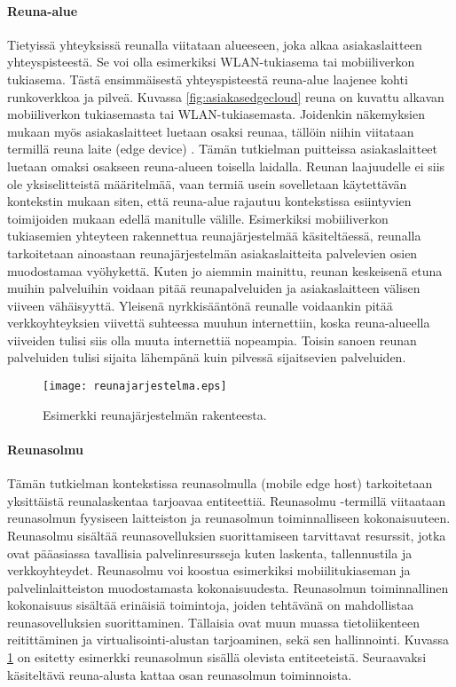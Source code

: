 \paragraph{Reuna-alue} 
Tietyissä yhteyksissä reunalla viitataan alueeseen, joka alkaa asiakaslaitteen yhteyspisteestä. Se voi olla esimerkiksi WLAN-tukiasema tai mobiiliverkon tukiasema. Tästä ensimmäisestä yhteyspisteestä reuna-alue laajenee kohti runkoverkkoa ja pilveä.
Kuvassa \ref{fig:asiakasedgecloud} reuna on kuvattu alkavan mobiiliverkon tukiasemasta tai WLAN-tukiasemasta.
Joidenkin näkemyksien mukaan myös asiakaslaitteet luetaan osaksi reunaa, tällöin niihin viitataan termillä reuna laite (edge device) \cite{garcia}.
Tämän tutkielman puitteissa asiakaslaitteet luetaan omaksi osakseen reuna-alueen toisella laidalla.
Reunan laajuudelle ei siis ole yksiselitteistä määritelmää, vaan termiä usein sovelletaan käytettävän kontekstin mukaan siten, että reuna-alue rajautuu kontekstissa esiintyvien toimijoiden mukaan edellä manitulle välille.
Esimerkiksi mobiiliverkon tukiasemien yhteyteen rakennettua reunajärjestelmää käsiteltäessä, reunalla tarkoitetaan ainoastaan reunajärjestelmän asiakaslaitteita palvelevien osien muodostamaa vyöhykettä. 
Kuten jo aiemmin mainittu, reunan keskeisenä etuna muihin palveluihin voidaan pitää reunapalveluiden ja asiakaslaitteen välisen viiveen vähäisyyttä.
Yleisenä nyrkkisääntönä reunalle voidaankin pitää verkkoyhteyksien viivettä suhteessa muuhun internettiin, koska reuna-alueella viiveiden tulisi siis olla muuta internettiä nopeampia. Toisin sanoen reunan palveluiden tulisi sijaita lähempänä kuin pilvessä sijaitsevien palveluiden.

\begin{figure}[tb]
\texttt{[image: reunajarjestelma.eps]}
\caption{Esimerkki reunajärjestelmän rakenteesta.} \label{fig:reunajarjestelma}
\end{figure}


\paragraph{Reunasolmu} 
Tämän tutkielman kontekstissa reunasolmulla (mobile edge host) tarkoitetaan yksittäistä reunalaskentaa tarjoavaa entiteettiä\cite{etsirefarch}.
Reunasolmu -termillä viitaataan reunasolmun fyysiseen laitteiston ja reunasolmun toiminnalliseen kokonaisuuteen.
Reunasolmu sisältää reunasovelluksien suorittamiseen tarvittavat resurssit, jotka ovat pääasiassa tavallisia palvelinresursseja kuten laskenta, tallennustila ja verkkoyhteydet.
Reunasolmu voi koostua esimerkiksi mobiilitukiaseman ja palvelinlaitteiston muodostamasta kokonaisuudesta. 
Reunasolmun toiminnallinen kokonaisuus sisältää erinäisiä toimintoja, joiden tehtävänä on mahdollistaa reunasovelluksien suorittaminen.
Tällaisia ovat muun muassa tietoliikenteen reitittäminen ja virtualisointi-alustan tarjoaminen, sekä sen hallinnointi.
Kuvassa \ref{fig:reunajarjestelma} on esitetty esimerkki reunasolmun sisällä olevista entiteeteistä. 
Seuraavaksi käsiteltävä reuna-alusta kattaa osan reunasolmun toiminnoista.

